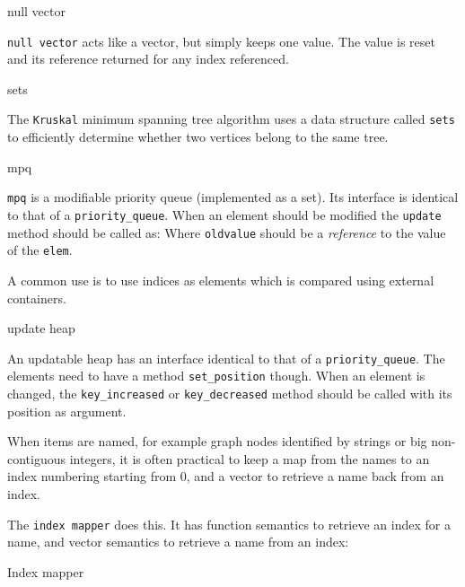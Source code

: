 \begin{algorithm}{null vector}

\desc
{\tt null vector} acts like a vector, but simply keeps one value.
The value is reset and its reference returned for any index referenced.
\end{algorithm}

\begin{algorithm}{sets}

\desc
The {\tt Kruskal} minimum spanning tree algorithm uses a data structure
called {\tt sets} to efficiently determine whether two vertices belong to
the same tree.
\end{algorithm}

\begin{algorithm}{mpq}

\desc
{\tt mpq} is a modifiable priority queue (implemented as a set). Its interface
is identical to that of a {\tt priority\_queue}. When an element should be
modified the {\tt update} method should be called as:
Where {\tt oldvalue} should be a \emph{reference} to the value of the
{\tt elem}.

\desc
A common use is to use indices as elements which is compared using external
containers.
\end{algorithm}

\begin{algorithm}{update heap}

\desc
An updatable heap has an interface identical to that of a
{\tt priority\_queue}.
The elements need to have a method {\tt set\_position} though. When an element
is changed, the {\tt key\_increased} or {\tt key\_decreased} method should
be called with its position as argument.
\end{algorithm}

When items are named, for example graph nodes identified by strings or big
non-contiguous integers, it is often practical to keep a map from the
names to an index numbering starting from 0, and a vector to retrieve a name
back from an index.

The {\tt index mapper} does this.
It has function semantics to retrieve an index for a name,
and vector semantics to retrieve a name from an index:
\begin{algorithm}{Index mapper}
\end{algorithm}

